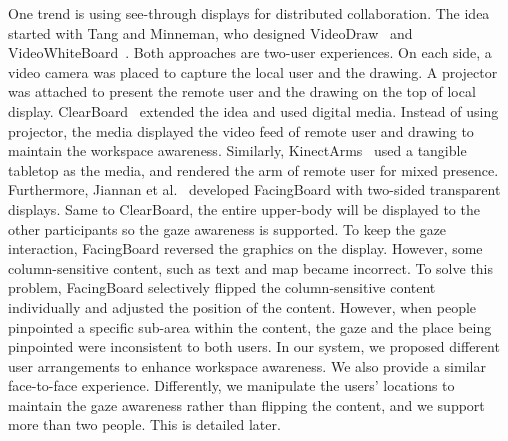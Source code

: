 \documentclass{sigchi}
\begin{document}
One trend is using see-through displays for distributed collaboration. The idea started with Tang and Minneman, who designed VideoDraw~\cite{tang1990videodraw} and VideoWhiteBoard~\cite{tang1991videowhiteboard}. Both approaches are two-user experiences. On each side, a video camera was placed to capture the local user and the drawing. A projector was attached to present the remote user and the drawing on the top of local display. ClearBoard~\cite{ishii1992clearboard} extended the idea and used digital media. Instead of using projector, the media displayed the video feed of remote user and drawing to maintain the workspace awareness. Similarly, KinectArms~\cite{genest2013kinectarms} used a tangible tabletop as the media, and rendered the arm of remote user for mixed presence. Furthermore, Jiannan et al.~\cite{li2014interactive} developed FacingBoard with two-sided transparent displays. Same to ClearBoard, the entire upper-body will be displayed to the other participants so the gaze awareness is supported. To keep the gaze interaction, FacingBoard reversed the graphics on the display. However, some column-sensitive content, such as text and map became incorrect. To solve this problem, FacingBoard selectively flipped the column-sensitive content individually and adjusted the position of the content. However, when people pinpointed a specific sub-area within the content, the gaze and the place being pinpointed were inconsistent to both users. In our system, we proposed different user arrangements to enhance workspace awareness. We also provide a similar face-to-face experience. Differently, we manipulate the users' locations to maintain the gaze awareness rather than flipping the content, and we support more than two people. This is detailed later.
\end{document}
